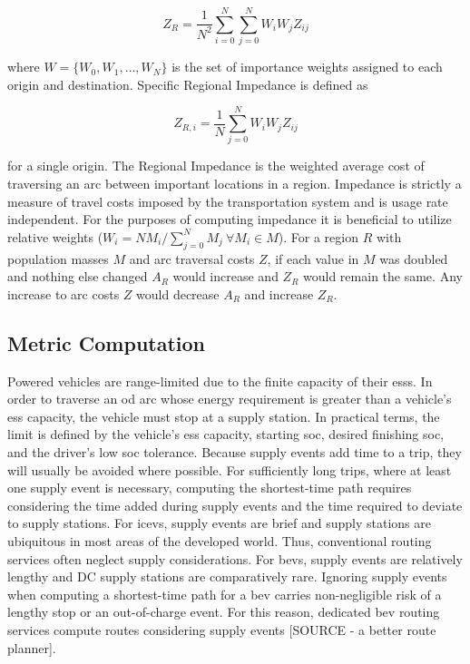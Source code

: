 \documentclass[11pt]{article}
\begin{document}
\begin{multicols}{2}
\begin{equation}
	Z_{R} = \frac{1}{N^2}\sum_{i = 0}^{N} \sum_{j = 0 }^{N} W_iW_jZ_{ij} \label{eq:regional_impedance}
\end{equation}

\noindent where $W = \{W_0, W_1, \dots, W_N\}$ is the set of importance weights assigned to each origin and destination. Specific Regional Impedance is defined as

\begin{equation}
	Z_{R,i} = \frac{1}{N}\sum_{j = 0 }^{N} W_iW_jZ_{ij} \label{eq:specific_regional_impedance}
\end{equation}

for a single origin. The Regional Impedance is the weighted average cost of traversing an arc between important locations in a region. Impedance is strictly a measure of travel costs imposed by the transportation system and is usage rate independent. For the purposes of computing impedance it is beneficial to utilize relative weights ($W_i = NM_i / \sum_{j = 0}^{N} M_j\ \forall M_i \in M$). For a region $R$ with population masses $M$ and arc traversal costs $Z$, if each value in $M$ was doubled and nothing else changed $A_R$ would increase and $Z_R$ would remain the same. Any increase to arc costs $Z$ would decrease $A_R$ and increase $Z_R$.

\subsection*{Metric Computation}

Powered vehicles are range-limited due to the finite capacity of their \glspl{ess}. In order to traverse an \gls{od} arc whose energy requirement is greater than a vehicle's \gls{ess} capacity, the vehicle must stop at a supply station. In practical terms, the limit is defined by the vehicle's \gls{ess} capacity, starting \gls{soc}, desired finishing \gls{soc}, and the driver's low \gls{soc} tolerance. Because supply events add time to a trip, they will usually be avoided where possible. For sufficiently long trips, where at least one supply event is necessary, computing the shortest-time path requires considering the time added during supply events and the time required to deviate to supply stations. For \glspl{icev}, supply events are brief and supply stations are ubiquitous in most areas of the developed world. Thus, conventional routing services often neglect supply considerations. For \glspl{bev}, supply events are relatively lengthy and DC supply stations are comparatively rare. Ignoring supply events when computing a shortest-time path for a \gls{bev} carries non-negligible risk of a lengthy stop or an out-of-charge event. For this reason, dedicated \gls{bev} routing services compute routes considering supply events [SOURCE  - a better route planner].


\end{multicols}
\end{document}
